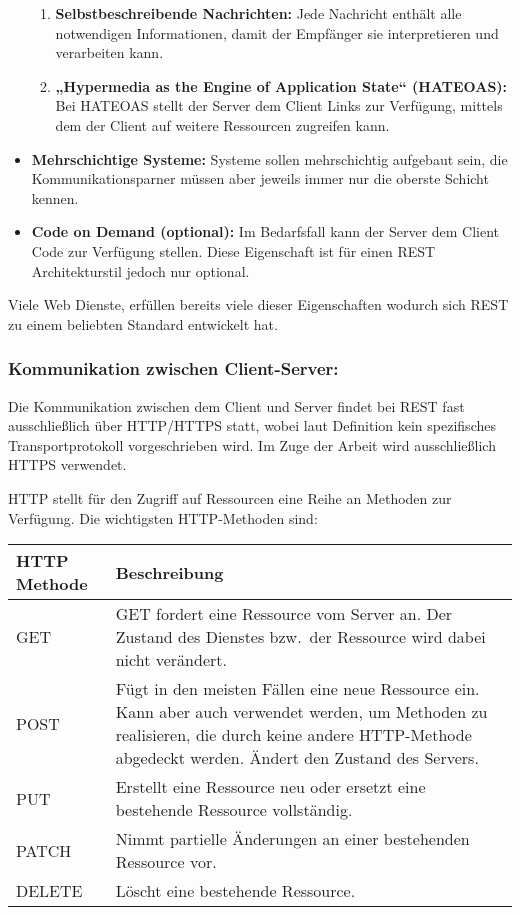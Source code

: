 \begin{itemize}
\begin{enumerate}
		\item \textbf{Selbstbeschreibende Nachrichten:}
		Jede Nachricht enthält alle notwendigen Informationen, damit der Empfänger sie interpretieren und verarbeiten kann.
		
		\item \textbf{„Hypermedia as the Engine of Application State“ (HATEOAS):} 
		Bei HATEOAS stellt der Server dem Client Links zur Verfügung, mittels dem der Client auf weitere Ressourcen zugreifen kann.
	\end{enumerate}
	
	\item \textbf{Mehrschichtige Systeme:}
	Systeme sollen mehrschichtig aufgebaut sein, die Kommunikationsparner müssen aber jeweils immer nur die oberste Schicht kennen.
	
	\item \textbf{Code on Demand (optional):}
	Im Bedarfsfall kann der Server dem Client Code zur Verfügung stellen. Diese Eigenschaft ist für einen REST Architekturstil jedoch nur optional.
\end{itemize} 
\parencite{fielding2000rest}

Viele Web Dienste, erfüllen bereits viele dieser Eigenschaften wodurch sich REST zu einem beliebten Standard entwickelt hat.

\clearpage

\subsubsection*{Kommunikation zwischen Client-Server:}
Die Kommunikation zwischen dem Client und Server findet bei REST fast ausschließlich über HTTP/HTTPS statt, wobei laut Definition kein spezifisches Transportprotokoll vorgeschrieben wird. Im Zuge der Arbeit wird ausschließlich HTTPS verwendet.

HTTP stellt für den Zugriff auf Ressourcen eine Reihe an Methoden zur Verfügung. Die wichtigsten HTTP-Methoden sind: \newline

\begin{tabularx}{\textwidth}{|l|X|}
	\hline
	\textbf{HTTP Methode} & \textbf{Beschreibung} \\
	\hline
	GET & GET fordert eine Ressource vom Server an. Der Zustand des Dienstes bzw.\ der Ressource wird dabei nicht verändert. \\
	\hline
	POST & Fügt in den meisten Fällen eine neue Ressource ein. Kann aber auch verwendet werden, um Methoden zu realisieren, die durch keine andere HTTP-Methode abgedeckt werden. Ändert den Zustand des Servers. \\
	\hline
PUT & Erstellt eine Ressource neu oder ersetzt eine bestehende Ressource vollständig. \\
\hline
PATCH & Nimmt partielle Änderungen an einer bestehenden Ressource vor. \\
	\hline
	DELETE & Löscht eine bestehende Ressource. \\
	\hline
\end{tabularx} \newline


